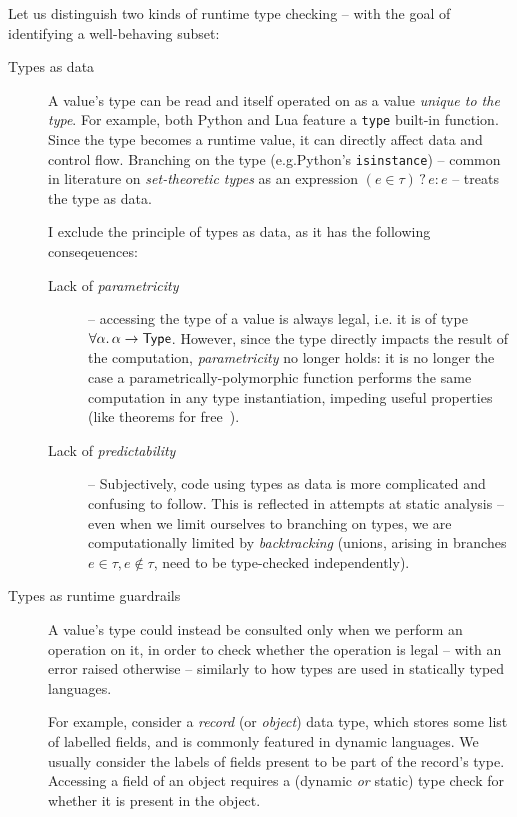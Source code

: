 Let us distinguish two kinds of runtime type checking -- with the goal of identifying a well-behaving subset: \begin{description}
    \item[Types as data] A value's type can be read and itself operated on as a value \emph{unique to the type}. For example, both Python and Lua feature a \texttt{type} built-in function. Since the type becomes a runtime value, it can directly affect data and control flow. 
    Branching on the type (e.g.\@ Python's \texttt{isinstance}) -- common in literature on \emph{set-theoretic types} as an expression $(e \in \tau) \mathop{?} e \mathop{:} e$ \cite{castagna-dynamic} -- treats the type as data. 
    
    I exclude the principle of types as data, as it has the following conseqeuences: \begin{description}
        \item[Lack of \emph{parametricity}] -- accessing the type of a value is always legal, i.e. it is of type $\forall \alpha \ldotp \alpha \to \textsf{Type}$. However, since the type directly impacts the result of the computation, \emph{parametricity} no longer holds: it is no longer the case a parametrically-polymorphic function performs the same computation in any type instantiation, impeding useful properties (like theorems for free~\cite{theorems-for-free}).
        \item[Lack of \emph{predictability}] -- Subjectively, code using types as data is more complicated and confusing to follow. This is reflected in attempts at static analysis -- even when we limit ourselves to branching on types, we are computationally limited by \emph{backtracking} \cite{polymorphic-set-theoretic-types, castagna-dynamic, mlstruct} (unions, arising in branches $e \in \tau, e \notin \tau$, need to be type-checked independently).
    \end{description}
    \item[Types as runtime guardrails] A value's type could instead be consulted only when we perform an operation on it, in order to check whether the operation is legal -- with an error raised otherwise -- similarly to how types are used in statically typed languages.     
    
    For example, consider a \emph{record} (or \emph{object}) data type, which stores some list of labelled fields, and is commonly featured in dynamic languages. 
    We usually consider the labels of fields present to be part of the record's type.
    Accessing a field of an object requires a (dynamic \emph{or} static) type check for whether it is present in the object.
    

\end{description}
